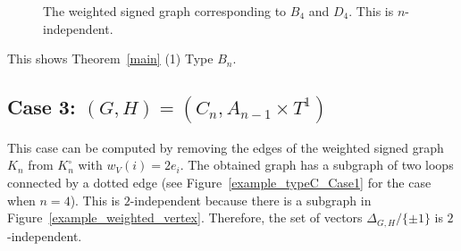 \documentclass{amsart}
\theoremstyle{definition}
\theoremstyle{remark}
\numberwithin{equation}{section}
\begin{document}
\begin{figure}[H]
\caption{The weighted signed graph corresponding to $B_{4}$ and $D_{4}$. This is $n$-independent. }
\label{example_typeB_Case3}
\end{figure}

This shows Theorem~\ref{main} (1) Type $B_{n}$.

\subsection{Case 3: $(G,H)=(C_{n},A_{n-1}\times T^{1})$}
\label{sect:6.3}
 
This case can be computed by removing the edges of the weighted signed graph $K_{n}$ from $K_{n}^{\circ}$ with $w_{V}(i)=2e_{i}$.
The obtained graph has a subgraph of two loops connected by a dotted edge (see Figure~\ref{example_typeC_Case1} for the case when $n=4$).
This is $2$-independent because there is a subgraph in  Figure~\ref{example_weighted_vertex}.
Therefore, the set of vectors $\Delta_{G,H}/\{\pm 1\}$ is $2$-independent.
\end{document}
